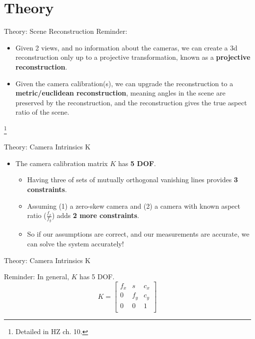 \documentclass{beamer}
\newcommand\blfootnote[1]{%
	\begingroup
	\renewcommand\thefootnote{}\footnote{#1}%
	\addtocounter{footnote}{-1}%
	\endgroup
}
\begin{document}
\section{Theory}

\begin{frame}{Theory: Scene Reconstruction}
Reminder: 
\begin{itemize}
	\item Given 2 views, and no information about the cameras, we can create a 3d reconstruction only up to a projective transformation, known as a \textbf{projective reconstruction}. 
	\item Given the camera calibration(s), we can upgrade the reconstruction to a \textbf{metric/euclidean reconstruction}, meaning angles in the scene are preserved by the reconstruction, and the reconstruction gives the true aspect ratio of the scene.
\end{itemize}

\blfootnote{Detailed in HZ ch. 10.}

\end{frame}


\begin{frame}{Theory: Camera Intrinsics K}
\begin{itemize}
\item The camera calibration matrix $ K $ has \textbf{5 DOF}.
\begin{itemize}
\item Having three of sets of mutually orthogonal vanishing lines provides \textbf{3 constraints}. 
\item Assuming (1) a zero-skew camera and (2) a camera with known aspect ratio ($ \frac{f_x}{f_y} $) adds \textbf{2 more constraints}.
\item So if our assumptions are correct, and our measurements are accurate, we can solve the system accurately!
\end{itemize}
\end{itemize}
\end{frame}

\begin{frame}{Theory: Camera Intrinsics K}

Reminder: In general, $ K $ has 5 DOF.
\[
K = 
\begin{bmatrix}
f_x & s & c_x \\
0 & f_y & c_y \\
0 & 0 & 1 \\
\end{bmatrix}
\]
\end{frame}
\end{document}
